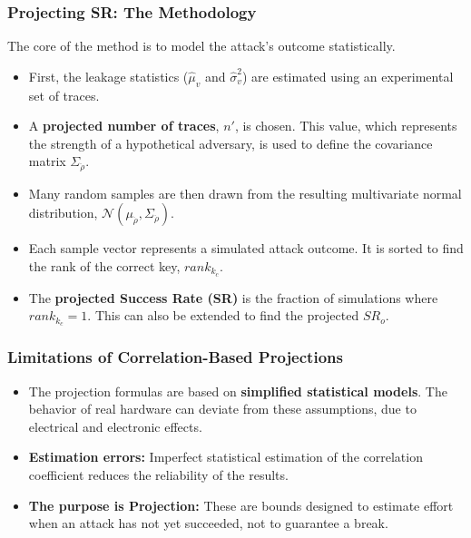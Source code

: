 \begin{frame}
    \frametitle{Projecting SR: The Methodology}
    
        The core of the method is to model the attack's outcome statistically.
        \begin{itemize}
            \item First, the leakage statistics ($\hat{\mu}_v$ and $\hat{\sigma}^2_v$) are estimated using an experimental set of traces.
            
            \item A \textbf{projected number of traces}, $n'$, is chosen. This value, which represents the strength of a hypothetical adversary, is used to define the covariance matrix $\Sigma_{\ddot{\rho}}$.
            
            \item Many random samples are then drawn from the resulting multivariate normal distribution, $\mathcal{N}(\mu_{\ddot{\rho}}, \Sigma_{\ddot{\rho}})$.
            
            \item Each sample vector represents a simulated attack outcome. It is sorted to find the rank of the correct key, $rank_{k_c}$.
            
            \item The \textbf{projected Success Rate (SR)} is the fraction of simulations where $rank_{k_c} = 1$. This can also be extended to find the projected $SR_o$.
        \end{itemize}
    
\end{frame}

\begin{frame}
    \frametitle{Limitations of Correlation-Based Projections}
    
    \begin{block}{ }
        \begin{itemize}
            \item  The projection formulas are based on \textbf{simplified statistical models}. The behavior of real hardware can deviate from these assumptions, due to electrical and electronic effects.
            
            \item \textbf{Estimation errors:} Imperfect statistical estimation of the correlation coefficient reduces the reliability of the results.
            
            \item \textbf{The purpose is Projection:} These are bounds designed to estimate effort when an attack has not yet succeeded, not to guarantee a break.
        \end{itemize}
    \end{block}
\end{frame}
